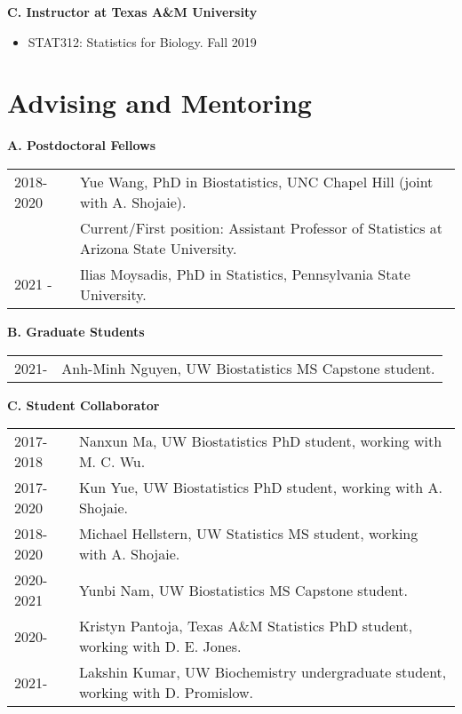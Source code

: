 \documentclass[10pt]{article}
\begin{document}
\textbf{C. Instructor at Texas A\&M University}
\begin{itemize} 
\item STAT312: Statistics for Biology. Fall 2019
\end{itemize}

\section*{Advising and Mentoring}

\textbf{A. Postdoctoral Fellows}
\begin{table}[H]
\hskip0.9cm\begin{tabular}{p{1.6cm}p{12cm}}
2018-2020 & Yue Wang, PhD in Biostatistics, UNC Chapel Hill (joint with A. Shojaie).\\
& Current/First position: Assistant Professor of Statistics at Arizona State University.\\
2021 -  & Ilias Moysadis, PhD in Statistics, Pennsylvania State University. 
\end{tabular}
\end{table}

\textbf{B. Graduate Students}

\begin{table}[H]
\hskip0.9cm\begin{tabular}{p{1.6cm}p{12cm}}
2021- & Anh-Minh Nguyen, UW Biostatistics MS Capstone student.
\end{tabular}
\end{table}

\textbf{C. Student Collaborator}
\begin{table}[H]
\hskip0.9cm\begin{tabular}{p{1.6cm}p{12cm}}
2017-2018 & Nanxun Ma, UW Biostatistics PhD student, working with M. C. Wu.\\
2017-2020 & Kun Yue, UW Biostatistics PhD student, working with A. Shojaie.\\
2018-2020 & Michael Hellstern, UW Statistics MS student, working with A. Shojaie. \\
2020-2021 & Yunbi Nam, UW Biostatistics MS Capstone student. \\
2020- & Kristyn Pantoja, Texas A\&M Statistics PhD student, working with D. E. Jones. \\
2021- & Lakshin Kumar, UW Biochemistry undergraduate student, working with D. Promislow.
\end{tabular}
\end{table}
\end{document}
